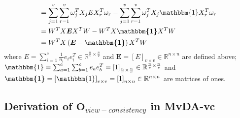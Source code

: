 \begin{appendix}
\begin{equation}
\begin{split}
            &= \sum_{j=1}^{v}\sum_{r=1}^{v} \omega_j^T X_j E X_r^T \omega_r - \sum_{j=1}^{v}\sum_{r=1}^{v} \omega_j^T X_j \mathbbm{1} X_r^T \omega_r \\
            &= W^T X \boldsymbol{E} X^T W - W^T X \boldsymbol{\mathbbm{1}} X^T W \\
            &= W^T X \left(\boldsymbol{E} - \boldsymbol{\mathbbm{1}}\right) X^T W
        \end{split}
        \label{eq:mvda_Sb_derivation}
    \end{equation}
    where $E = \sum_{i=1}^{c}\frac{1}{n_i}e_i e_i^T \in \mathbb{R}^{\frac{n}{v}\times \frac{n}{v}}$ and $\boldsymbol{E} = \left[E\right]_{v\times v} \in \mathbb{R}^{n\times n}$ are defined above; $\mathbbm{1} = \sum_{a=1}^{c}\sum_{b=1}^{c}e_a e_b^T = \left[1\right]_{\frac{n}{v} \times \frac{n}{v}} \in \mathbb{R}^{\frac{n}{v}\times \frac{n}{v}}$ and $\boldsymbol{\mathbbm{1}} = \left[\mathbbm{1}\right]_{v\times v} = \left[1\right]_{n \times n} \in \mathbb{R}^{n\times n}$ are matrices of ones.

\subsection{Derivation of \texorpdfstring{$\boldsymbol{O}_{view-consistency}$}{view-consistency term} in MvDA-vc} \label{subsec:derivation_mvdavc}


\end{appendix}

